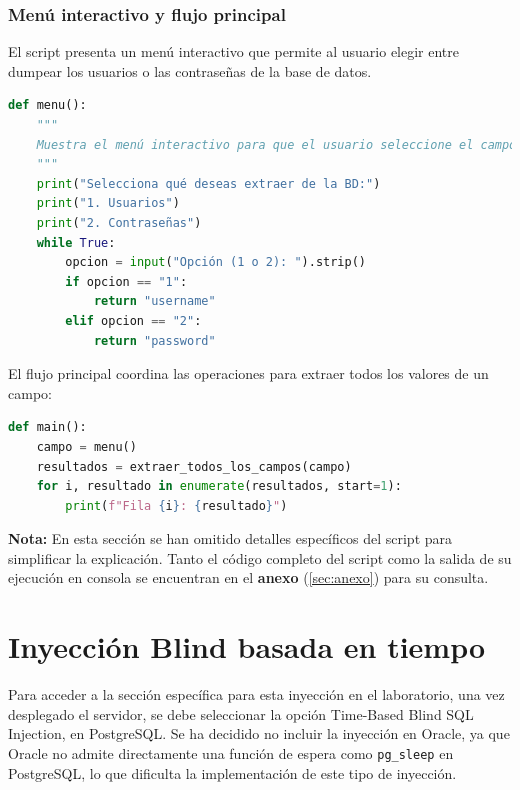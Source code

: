 \documentclass[a4paper,12pt]{article}
\begin{document}
\subsubsection{Menú interactivo y flujo principal}

El script presenta un menú interactivo que permite al usuario elegir entre dumpear los usuarios o las contraseñas de la base de datos.

\begin{lstlisting}[language=Python]
def menu():
    """
    Muestra el menú interactivo para que el usuario seleccione el campo a extraer.
    """
    print("Selecciona qué deseas extraer de la BD:")
    print("1. Usuarios")
    print("2. Contraseñas")
    while True:
        opcion = input("Opción (1 o 2): ").strip()
        if opcion == "1":
            return "username"
        elif opcion == "2":
            return "password"
\end{lstlisting}

El flujo principal coordina las operaciones para extraer todos los valores de un campo:

\begin{lstlisting}[language=Python]
def main():
    campo = menu()
    resultados = extraer_todos_los_campos(campo)
    for i, resultado in enumerate(resultados, start=1):
        print(f"Fila {i}: {resultado}")
\end{lstlisting}

\textbf{Nota:} En esta sección se han omitido detalles específicos del script para simplificar la explicación. Tanto el código completo del script como la salida de su ejecución en consola se encuentran en el \textbf{anexo} (\ref{sec:anexo}) para su consulta.




\section{Inyección Blind basada en tiempo}

Para acceder a la sección específica para esta inyección en el laboratorio, una vez desplegado
el servidor, se debe seleccionar la opción Time-Based Blind SQL Injection, en
PostgreSQL. Se ha decidido no incluir la inyección en Oracle, ya que Oracle no admite directamente una
función de espera como \texttt{pg\_sleep} en PostgreSQL, lo que dificulta la implementación de este tipo de inyección.
\end{document}
